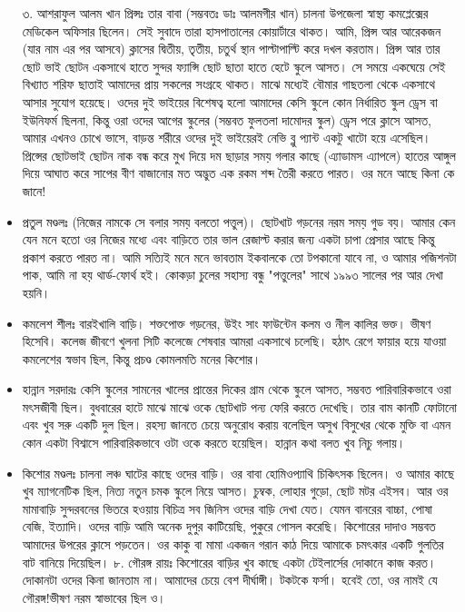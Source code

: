 \documentclass{report}
\begin{document}
\begin{itemize}
৩. আশরাফুল আলম খান প্রিন্সঃ  তার বাবা (সম্ভবতঃ ডাঃ আলমগীর খান) চালনা উপজেলা স্বাস্থ্য কমপ্লেক্সের মেডিকেল অফিসার ছিলেন। সেই সুবাদে তারা হাসপাতালের কোয়ার্টারে থাকত। আমি, প্রিন্স আর আরেকজন (যার নাম এর পর আসবে) ক্লাসের দ্বিতীয়, তৃতীয়, চতুর্থ স্থান পাল্টাপাল্টি করে দখল করতাম। প্রিন্স আর তার ছোট ভাই ছোটন একসাথে হাতে সুন্দর ফ্যান্সি ছোট ছাতা হাতে হেটে স্কুলে আসত। সে সময়ে একঘেয়ে সেই বিখ্যাত শরিফ ছাতাই আমাদের প্রায় সকলের সংগ্রহে থাকত। মাঝে মধ্যেই বৌমার গাছতলা থেকে একসাথে আসার সুযোগ হয়েছে। ওদের দুই ভাইয়ের বিশেষত্ব হলো আমাদের কেসি স্কুলে কোন নির্ধারিত স্কুল ড্রেস বা ইউনিফর্ম ছিলনা, কিন্তু ওরা ওদের আগের স্কুলের (সম্ভবত ফুলতলা দামোদর স্কুল) ড্রেস পরে ক্লাসে আসত, আমার এখনও চোখে ভাসে, বাড়ন্ত শরীরে ওদের দুই ভাইয়েরই নেভি ব্লু প্যান্ট একটু খাটো হয়ে এসেছিল। প্রিন্সের ছোটভাই ছোটন নাক বন্ধ করে মুখ দিয়ে দম ছাড়ার সময় গলার কাছে (এ্যাডামস এ্যাপলে) হাতের আঙ্গুল দিয়ে আঘাত করে সাপের বীণ বাজানোর মত অদ্ভুত এক রকম শব্দ তৈরী করতে পারত। ওর মনে আছে কিনা কে জানে!
\item প্রতুল মণ্ডলঃ (নিজের নামকে সে বলার সময় বলতো পত্তুল)। ছোটখাট গড়নের নরম সময় গুড বয়। আমার কেন যেন মনে হতো ওর নিজের মধ্যে এবং বাড়িতে তার ভাল রেজাল্ট করার জন্য একটা চাপা প্রেসার আছে কিন্তু প্রকাশ করতে পারত না। আমি সত্যিই মনে মনে ভাবতাম ইকবালকে তো টপকানো যাবে না, ও আমার পজিশনটা পাক, আমি না হয় থার্ড-ফোর্থ হই। কোকড়া চুলের সহাস্য বন্ধু "পত্তুলের" সাথে ১৯৯৩ সালের পর আর দেখা হয়নি।
\item কমলেশ শীলঃ বারইখালি বাড়ি। শক্তপোক্ত গড়নের, উইং সাং ফাউন্টেন কলম ও নীল কালির ভক্ত। ভীষণ হিসেবি। কলেজ জীবণে খুলনা সিটি কলেজে শেষবার আমরা একসাথে চলেছি। হঠাৎ রেগে ফায়ার হয়ে যাওয়া কমলেশের স্বভাব ছিল, কিন্তু প্রচণ্ড কোমলমতি মনের কিশোর।
\item হান্নান সরদারঃ কেসি স্কুলের সামনের খালের প্রান্তের দিকের গ্রাম থেকে স্কুলে আসত, সম্ভবত পারিবারিকভাবে ওরা মৎসজীবী ছিল। বুধবারের হাটে মাঝে মাঝে ওকে ছোটখাট পন্য ফেরি করতে দেখেছি। তার বাম কানটি ফোটানো এবং খুব সরু একটি দুল ছিল। রহস্য জানতে চেয়ে অনুরোধ করায় বলেছিল অসুখ বিসুখের থেকে মুক্তি বা এমন কোন একটা বিশ্বাসে পারিবারিকভাবে ওটা ওকে করতে হয়েছিল। হান্নান কথা বলত খুব নিচু গলায়।
\item  কিশোর মণ্ডলঃ চালনা লঞ্চ ঘাটের কাছে ওদের বাড়ি। ওর বাবা হোমিওপ্যাথি চিকিৎসক ছিলেন। ও আমার কাছে খুব ম্যাগনেটিক ছিল, নিত্য নতুন চমক স্কুলে নিয়ে আসত। চুম্বক, লোহার গুড়ো, ছোট মটর এইসব। আর ওর মামাবাড়ি সুন্দরবনের ভিতরে হওয়ায় বিচিত্র সব জিনিস ওদের বাড়ি দেখা যেত। যেমন বানরের বাচ্চা, পোষা বেজি, ইত্যাদি। ওদের বাড়ি আমি অনেক দুপুর কাটিয়েছি, পুকুরে গোসল করেছি। কিশোরের দাদাও সম্ভবত আমাদের উপরের ক্লাসে পড়তেন। ওর কাকু বা মামা একজন গরান কাঠ দিয়ে আমাকে চমৎকার একটি গুলতির বাট বানিয়ে দিয়েছিল।
৮. গৌরঙ্গ রায়ঃ কিশোরের বাড়ির খুব কাছে একটা টেইলার্সের দোকানে কাজ করত। দোকানটা ওদের কিনা জানতাম না। আমাদের চেয়ে বেশ দীর্ঘাঙ্গী। টকটকে ফর্সা। হবেই তো, ওর নামই যে গৌরঙ্গ!ভীষণ নরম স্বাভাবের ছিল ও।

\end{itemize}
\end{document}
